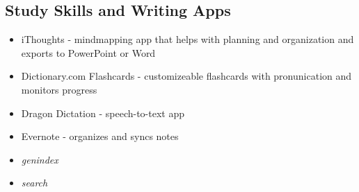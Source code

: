\documentclass[letterpaper,10pt,english]{sphinxmanual}
\begin{document}
\subsection{Study Skills and Writing Apps}
\label{resources:study-skills-and-writing-apps}\begin{itemize}
\item {} 
iThoughts - mindmapping app that helps with planning and organization and exports to PowerPoint or Word

\item {} 
Dictionary.com Flashcards - customizeable flashcards with pronunication and monitors progress

\item {} 
Dragon Dictation - speech-to-text app

\item {} 
Evernote - organizes and syncs notes

\end{itemize}
\begin{itemize}
\item {} 
\emph{genindex}

\item {} 
\emph{search}

\end{itemize}



\renewcommand{\indexname}{Index}
\printindex
\end{document}
